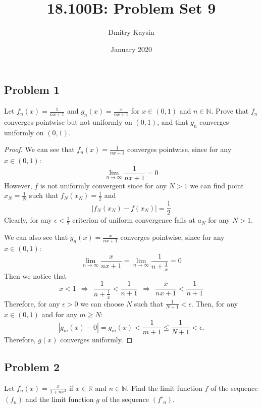 \documentclass{article}
\title{18.100B: Problem Set 9}
\author{Dmitry Kaysin}
\date{January 2020}
\newcommand{\R}{\mathbb{R}}
\newcommand{\N}{\mathbb{N}}
\begin{document}
\maketitle 


\subsection*{Problem 1}

\begin{tcolorbox}
Let $f_n(x) = \frac{1}{nx+1}$ and $g_n(x) = \frac{x}{nx+1}$ for $x \in (0, 1)$ and $n \in \N$.
Prove that $f_n$ converges pointwise but not uniformly on $(0, 1)$, and that $g_n$ converges uniformly on $(0, 1)$.
\end{tcolorbox}

\begin{proof}

We can see that $f_n(x) = \frac{1}{nx+1}$ converges pointwise, since for any $x \in (0,1)$:
\[ \lim_{n \to \infty} \frac{1}{nx+1} = 0 \]
However, $f$ is not uniformly convergent since for any $N > 1$ we can find point $x_N = \frac{1}{N}$ such that $f_N(x_N) = \frac{1}{2}$ and
$$ | f_N(x_N) - f(x_N) | = \frac{1}{2} $$
Clearly, for any $\epsilon < \frac{1}{2}$ criterion of uniform convergence fails at $a_N$ for any $N > 1$.

We can also see that $g_n(x) = \frac{x}{nx+1}$ converges pointwise, since for any $x \in (0,1)$:
\[ \lim_{n \to \infty} \frac{x}{nx+1} = \lim_{n \to \infty} \frac{1}{n+\frac{1}{x}} = 0 \]
Then we notice that
\[ x < 1 \>\> \Rightarrow \>\> \frac{1}{n+\frac{1}{x}} < \frac{1}{n+1} \>\> \Rightarrow \>\> \frac{x}{nx+1} < \frac{1}{n+1} \]
Therefore, for any $\epsilon>0$ we can choose $N$ such that $ \frac{1}{N+1} < \epsilon$.
Then, for any $x \in (0,1)$ and for any $m \geq N$:
\[ | g_m(x) - 0 | = g_m(x) < \frac{1}{m+1} \leq \frac{1}{N+1} < \epsilon. \]
Therefore, $g(x)$ converges uniformly.

\end{proof}


\subsection*{Problem 2}

\begin{tcolorbox}
Let $f_n (x) = \frac{x}{1 + nx^2}$ if $x \in \R$ and $n \in \N$.
Find the limit function $f$ of the sequence $(f_n)$ and the limit function $g$ of the sequence $(f'_n)$. 
\end{tcolorbox}
\end{document}
